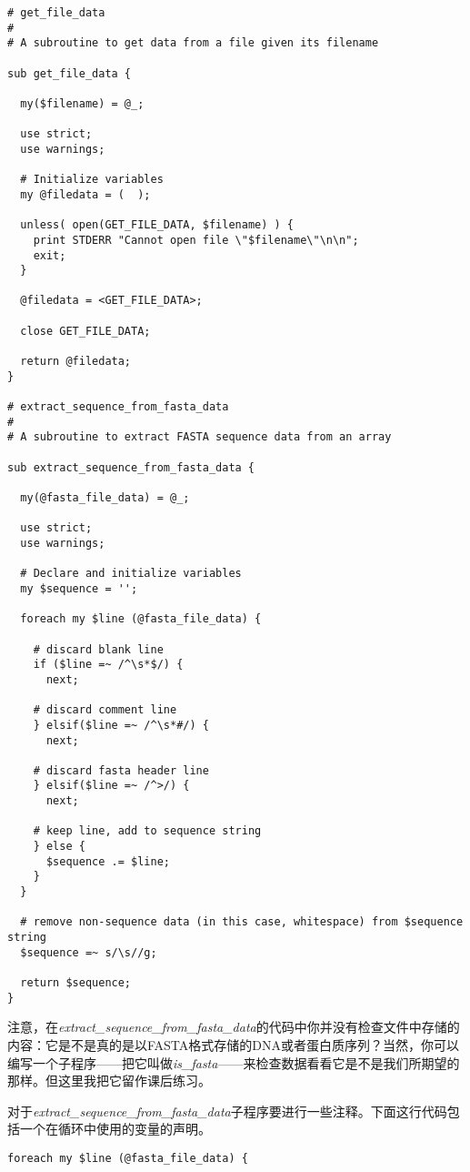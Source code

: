 \begin{lstlisting}
# get_file_data
#
# A subroutine to get data from a file given its filename

sub get_file_data {

  my($filename) = @_;

  use strict;
  use warnings;

  # Initialize variables
  my @filedata = (  );

  unless( open(GET_FILE_DATA, $filename) ) {
    print STDERR "Cannot open file \"$filename\"\n\n";
    exit;
  }

  @filedata = <GET_FILE_DATA>;

  close GET_FILE_DATA;

  return @filedata;
}

# extract_sequence_from_fasta_data
#
# A subroutine to extract FASTA sequence data from an array

sub extract_sequence_from_fasta_data {

  my(@fasta_file_data) = @_;

  use strict;
  use warnings;

  # Declare and initialize variables
  my $sequence = '';

  foreach my $line (@fasta_file_data) {

    # discard blank line
    if ($line =~ /^\s*$/) {
      next;

    # discard comment line
    } elsif($line =~ /^\s*#/) {
      next;

    # discard fasta header line
    } elsif($line =~ /^>/) {
      next;

    # keep line, add to sequence string
    } else {
      $sequence .= $line;
    }
  }

  # remove non-sequence data (in this case, whitespace) from $sequence string
  $sequence =~ s/\s//g;

  return $sequence;
}
\end{lstlisting}

注意，在\textit{extract\_sequence\_from\_fasta\_data}的代码中你并没有检查文件中存储的内容：它是不是真的是以FASTA格式存储的DNA或者蛋白质序列？当然，你可以编写一个子程序——把它叫做\textit{is\_fasta}——来检查数据看看它是不是我们所期望的那样。但这里我把它留作课后练习。

对于\textit{extract\_sequence\_from\_fasta\_data}子程序要进行一些注释。下面这行代码包括一个在循环中使用的变量的声明。

\begin{lstlisting}
foreach my $line (@fasta_file_data) {
\end{lstlisting}

